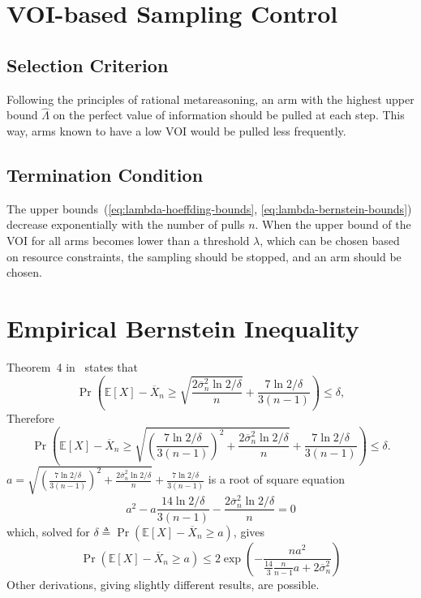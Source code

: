 \documentclass{article}
\newcommand {\IE} {\ensuremath {\mathbb{E}}}
\begin{document}
\section{VOI-based Sampling Control}

\subsection{Selection Criterion}

Following the principles of rational metareasoning, an arm with the highest upper bound $\hat
\Lambda$ on the perfect value of information should be pulled at each
step. This way, arms known to have a low VOI  would be pulled less frequently.

\subsection{Termination Condition}

The upper bounds~(\ref{eq:lambda-hoeffding-bounds}, \ref{eq:lambda-bernstein-bounds}) decrease exponentially with the
number of pulls $n$. When the upper bound of the VOI for all arms
becomes lower than a threshold $\lambda$, which can be chosen based on
resource constraints, the sampling should be stopped, and an arm should
be chosen.

\appendix

\section{Empirical Bernstein Inequality}
\label{app:deriv-conc-empbernstein}

Theorem~4 in~\cite{MaurerPontil.benrstein} states that
\[\Pr\left(\IE[X]-\overline X_n \ge \sqrt { \frac {2\overline\sigma_n^2 \ln 2/\delta} n } + \frac {7 \ln 2/\delta} {3(n-1)}\right)\le \delta,\]
Therefore
\[\Pr\left(\IE[X]-\overline X_n \ge \sqrt { \left(\frac {7 \ln 2/\delta} {3(n-1)}\right)^2+\frac {2\overline\sigma_n^2 \ln 2/\delta} n } + \frac {7 \ln 2/\delta} {3(n-1)}\right)\le
\delta.\]
$a=\sqrt { \left(\frac {7 \ln 2/\delta} {3(n-1)}\right)^2+\frac {2\overline\sigma_n^2 \ln 2/\delta} n } + \frac {7 \ln 2/\delta} {3(n-1)}$ is a root of
square equation
\[a^2-a\frac {14 \ln 2/\delta} {3(n-1)} -\frac {2\overline\sigma_n^2 \ln 2/\delta} n=0\]
which, solved for $\delta\triangleq\Pr(\IE[X]-\overline X_n\ge a)$,
gives
\[\Pr(\IE[X]-\overline X_n\ge a)\le 2\exp \left( - \frac {na^2} {\frac {14} {3} \frac {n} {n-1}a+2\overline\sigma_n^2}\right)\]
Other derivations, giving slightly different results, are possible.



\end{document}
